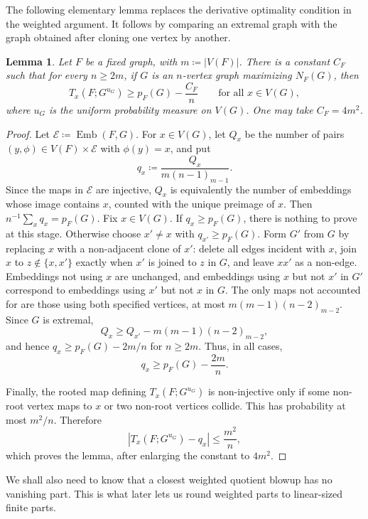 \documentclass[10pt]{article}
\theoremstyle{plain}
\newtheorem{lemma}[lemma]{Lemma}
\theoremstyle{remark}
\DeclareMathOperator{\Emb}{Emb}
\begin{document}
The following elementary lemma replaces the derivative optimality condition in the weighted argument. It follows by comparing an extremal graph with the graph obtained after cloning one vertex by another.

\begin{lemma}
\label{lem:finite-local-optimality}
Let $F$ be a fixed graph, with $m\coloneqq |V(F)|$. There is a constant $C_F$ such that for every $n\ge2m$, if $G$ is an $n$-vertex graph maximizing $N_F(G)$, then
\[
        T_x(F;G^{u_G})\ge p_F(G)-\frac{C_F}{n}
        \qquad\text{for all }x\in V(G),
\]
where $u_G$ is the uniform probability measure on $V(G)$. One may take $C_F=4m^2$.
\end{lemma}

\begin{proof}
Let $\mathcal E\coloneqq\Emb(F,G)$. For $x\in V(G)$, let $Q_x$ be the number of pairs $(y,\phi)\in V(F)\times\mathcal E$ with $\phi(y)=x$, and put
\[
        q_x\coloneqq\frac{Q_x}{m(n-1)_{m-1}}.
\]
Since the maps in $\mathcal E$ are injective, $Q_x$ is equivalently the number of embeddings whose image contains $x$, counted with the unique preimage of $x$.
Then $n^{-1}\sum_x q_x=p_F(G)$. Fix $x\in V(G)$. If $q_x\ge p_F(G)$, there is nothing to prove at this stage. Otherwise choose $x'\ne x$ with $q_{x'}\ge p_F(G)$. Form $G'$ from $G$ by replacing $x$ with a non-adjacent clone of $x'$: delete all edges incident with $x$, join $x$ to $z\notin\{x,x'\}$ exactly when $x'$ is joined to $z$ in $G$, and leave $xx'$ as a non-edge. Embeddings not using $x$ are unchanged, and embeddings using $x$ but not $x'$ in $G'$ correspond to embeddings using $x'$ but not $x$ in $G$. The only maps not accounted for are those using both specified vertices, at most $m(m-1)(n-2)_{m-2}$. Since $G$ is extremal,
\[
        Q_x\ge Q_{x'}-m(m-1)(n-2)_{m-2},
\]
and hence $q_x\ge p_F(G)-2m/n$ for $n\ge2m$. Thus, in all cases,
\[
        q_x\ge p_F(G)-\frac{2m}{n}.
\]

Finally, the rooted map defining $T_x(F;G^{u_G})$ is non-injective only if some non-root vertex maps to $x$ or two non-root vertices collide. This has probability at most $m^2/n$. Therefore
\[
        |T_x(F;G^{u_G})-q_x|\le \frac{m^2}{n},
\]
which proves the lemma, after enlarging the constant to $4m^2$.
\end{proof}

We shall also need to know that a closest weighted quotient blowup has no vanishing part. This is what later lets us round weighted parts to linear-sized finite parts.
\end{document}
